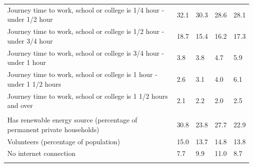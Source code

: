 \documentclass{article}
\begin{document}
\begin{table}[h]
\begin{tabular}{KTTTT}
Journey time to work, school or college is 1/4 hour - under 1/2 hour & 32.1& 30.3& 28.6& 28.1\\
Journey time to work, school or college is 1/2 hour - under 3/4 hour & 18.7& 15.4& 16.2& 17.3\\
Journey time to work, school or college is 3/4 hour - under 1 hour & 3.8& 3.8& 4.7& 5.9\\
Journey time to work, school or college is 1 hour - under 1 1/2 hours & 2.6& 3.1& 4.0& 6.1\\
Journey time to work, school or college is 1 1/2 hours and over & 2.1& 2.2& 2.0& 2.5\\
\hline
    \\ 
    \hline
Has renewable energy source (percentage of permanent private households) & 30.8& 23.8& 27.7& 22.9\\
    \hline
Volunteers (percentage of population) & 15.0& 13.7& 14.8& 13.8\\
    \hline
No internet connection&  7.7&  9.9& 11.0&  8.7\\
\hline
\end{tabular}
\end{table}
\end{document}
